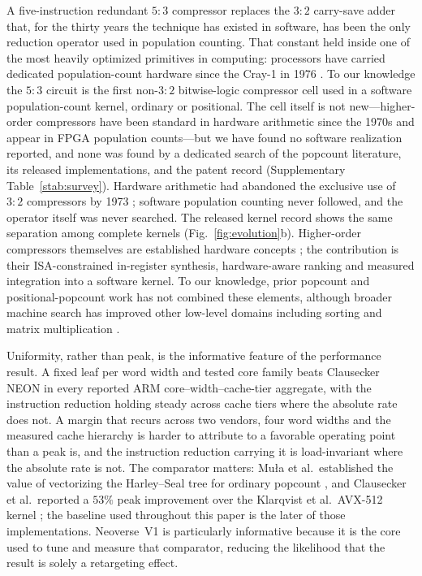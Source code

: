 \documentclass[fleqn,10pt]{wlscirep}
\begin{document}
A five-instruction redundant $5{:}3$ compressor replaces the $3{:}2$ carry-save adder that, for the thirty years the technique has existed in software, has been the only reduction operator used in population counting. That constant held inside one of the most heavily optimized primitives in computing: processors have carried dedicated population-count hardware since the Cray-1 in 1976 \cite{cray1977hrm}. To our knowledge the $5{:}3$ circuit is the first non-$3{:}2$ bitwise-logic compressor cell used in a software population-count kernel, ordinary or positional. The cell itself is not new---higher-order compressors have been standard in hardware arithmetic since the 1970s and appear in FPGA population counts---but we have found no software realization reported, and none was found by a dedicated search of the popcount literature, its released implementations, and the patent record (Supplementary Table~\ref{stab:survey}). Hardware arithmetic had abandoned the exclusive use of $3{:}2$ compressors by 1973 \cite{swartzlander1973}; software population counting never followed, and the operator itself was never searched. The released kernel record shows the same separation among complete kernels (Fig.~\ref{fig:evolution}b). Higher-order compressors themselves are established hardware concepts \cite{wallace1964,dadda1965,swartzlander1973}; the contribution is their ISA-constrained in-register synthesis, hardware-aware ranking and measured integration into a software kernel. To our knowledge, prior popcount and positional-popcount work has not combined these elements, although broader machine search has improved other low-level domains including sorting and matrix multiplication \cite{mankowitz2023alphadev,fawzi2022alphatensor}.

Uniformity, rather than peak, is the informative feature of the performance result. A fixed leaf per word width and tested core family beats Clausecker NEON in every reported ARM core--width--cache-tier aggregate, with the instruction reduction holding steady across cache tiers where the absolute rate does not. A margin that recurs across two vendors, four word widths and the measured cache hierarchy is harder to attribute to a favorable operating point than a peak is, and the instruction reduction carrying it is load-invariant where the absolute rate is not. The comparator matters: Mu{\l}a et al.\ established the value of vectorizing the Harley--Seal tree for ordinary popcount \cite{Mula2016}, and Clausecker et al.\ reported a $53\%$ peak improvement over the Klarqvist et al.\ AVX-512 kernel \cite{klarqvist2019,clausecker2024}; the baseline used throughout this paper is the later of those implementations. Neoverse~V1 is particularly informative because it is the core used to tune and measure that comparator, reducing the likelihood that the result is solely a retargeting effect.
\end{document}
